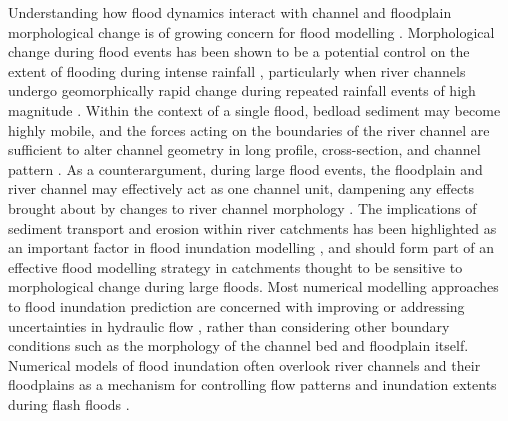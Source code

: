Understanding how flood dynamics interact with channel and floodplain morphological change is of growing concern for flood modelling \citep{fewtrell2011geometric}. Morphological change during flood events has been shown to be a potential control on the extent of flooding during intense rainfall \citep{schumm1979geomorphic,stover2001channel,wong2015sensitivity}, particularly when river channels undergo geomorphically rapid change during repeated rainfall events of high magnitude \citep{sear2010guidebook,slater2016extent}. Within the context of a single flood, bedload sediment may become highly mobile, and the forces acting on the boundaries of the river channel are sufficient to alter channel geometry in long profile, cross-section, and channel pattern \citep{kleinhans2013splitting,wong2015sensitivity}. As a counterargument, during large flood events, the floodplain and river channel may effectively act as one channel unit, dampening any effects brought about by changes to river channel morphology \citep{bates2005numerical}. The implications of sediment transport and erosion within river catchments has been highlighted as an important factor in flood inundation modelling \citep{lane2007interactions,lane2008reconceptualising,neuhold2009incorporating}, and should form part of an effective flood modelling strategy \citep{wong2015sensitivity} in catchments thought to be sensitive to morphological change during large floods. Most numerical modelling approaches to flood inundation prediction are concerned with improving or addressing uncertainties in hydraulic flow \citep{galland1991telemac,bates2000simple}, rather than considering other boundary conditions such as the morphology of the channel bed and floodplain itself. Numerical models of flood inundation often overlook river channels and their floodplains as a mechanism for controlling flow patterns and inundation extents during flash floods \citep{neuhold2009incorporating}.

